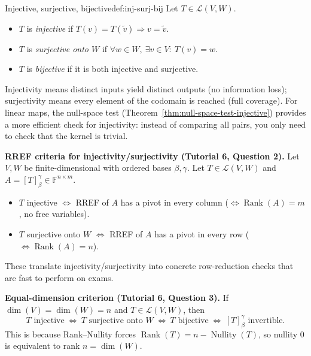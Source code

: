 \begin{definition}{Injective, surjective, bijective}{def:inj-surj-bij}
Let $T\in\mathcal{L}(V,W)$.
\begin{itemize}
\item $T$ is \emph{injective} if $T(v)=T(\tilde v)\Rightarrow v=\tilde v$.
\item $T$ is \emph{surjective onto $W$} if $\forall w\in W,\ \exists v\in V:\ T(v)=w$.
\item $T$ is \emph{bijective} if it is both injective and surjective.
\end{itemize}

\end{definition}

Injectivity means distinct inputs yield distinct outputs (no information loss); surjectivity means every element of the codomain is reached (full coverage).
For linear maps, the null-space test (Theorem~\ref{thm:null-space-test-injective}) provides a more efficient check for injectivity: instead of comparing all pairs, you only need to check that the kernel is trivial.

\begin{keyformula}
\textbf{RREF criteria for injectivity/surjectivity (Tutorial 6, Question 2).}
Let $V,W$ be finite-dimensional with ordered bases $\beta,\gamma$. Let $T\in\mathcal{L}(V,W)$ and $A=[T]^{\gamma}_{\beta}\in\mathbb{F}^{n\times m}$.
\begin{itemize}
\item $T$ injective $\Longleftrightarrow$ RREF of $A$ has a pivot in every column ($\Leftrightarrow \operatorname{Rank}(A)=m$, no free variables).
\item $T$ surjective onto $W$ $\Longleftrightarrow$ RREF of $A$ has a pivot in every row ($\Leftrightarrow \operatorname{Rank}(A)=n$).
\end{itemize}
These translate injectivity/surjectivity into concrete row-reduction checks that are fast to perform on exams.
\end{keyformula}

\begin{keyformula}
\textbf{Equal-dimension criterion (Tutorial 6, Question 3).}
If $\dim(V)=\dim(W)=n$ and $T\in\mathcal{L}(V,W)$, then
\[
T\text{ injective}\ \Longleftrightarrow\ T\text{ surjective onto }W\ \Longleftrightarrow\ T\text{ bijective}\ \Longleftrightarrow\ [T]^{\gamma}_{\beta}\text{ invertible}.
\]
This is because Rank--Nullity forces $\operatorname{Rank}(T)=n-\operatorname{Nullity}(T)$, so nullity $0$ is equivalent to rank $n=\dim(W)$.
\end{keyformula}

